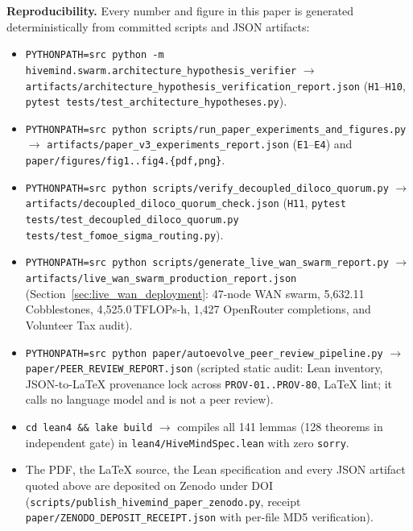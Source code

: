 \documentclass[11pt,a4paper]{article}
\begin{document}
\textbf{Reproducibility.} Every number and figure in this paper is generated deterministically from committed scripts and JSON artifacts:
\begin{itemize}[leftmargin=1.8em]
    \item \texttt{PYTHONPATH=src python -m hivemind.swarm.architecture\_hypothesis\_verifier} $\to$ \texttt{artifacts/architecture\_hypothesis\_verification\_report.json} (\texttt{H1}--\texttt{H10}, \texttt{pytest tests/test\_architecture\_hypotheses.py}).
    \item \texttt{PYTHONPATH=src python scripts/run\_paper\_experiments\_and\_figures.py} $\to$ \texttt{artifacts/paper\_v3\_experiments\_report.json} (\texttt{E1}--\texttt{E4}) and \texttt{paper/figures/fig1..fig4.\{pdf,png\}}.
    \item \texttt{PYTHONPATH=src python scripts/verify\_decoupled\_diloco\_quorum.py} $\to$ \texttt{artifacts/decoupled\_diloco\_quorum\_check.json} (\texttt{H11}, \texttt{pytest tests/test\_decoupled\_diloco\_quorum.py tests/test\_fomoe\_sigma\_routing.py}).
    \item \texttt{PYTHONPATH=src python scripts/generate\_live\_wan\_swarm\_report.py} $\to$ \texttt{artifacts/live\_wan\_swarm\_production\_report.json} (Section~\ref{sec:live_wan_deployment}: 47-node WAN swarm, 5{,}632.11 Cobblestones, 4{,}525.0\,TFLOPs-h, 1{,}427 OpenRouter completions, and Volunteer Tax audit).
    \item \texttt{PYTHONPATH=src python paper/autoevolve\_peer\_review\_pipeline.py} $\to$ \texttt{paper/PEER\_REVIEW\_REPORT.json} (scripted static audit: Lean inventory, JSON-to-LaTeX provenance lock across \texttt{PROV-01..PROV-80}, LaTeX lint; it calls no language model and is not a peer review).
    \item \texttt{cd lean4 \&\& lake build} $\to$ compiles all 141 lemmas (128 theorems in independent gate) in \texttt{lean4/HiveMindSpec.lean} with zero \texttt{sorry}.
    \item The PDF, the LaTeX source, the Lean specification and every JSON artifact quoted above are deposited on Zenodo under DOI \zenodoDOI{} (\texttt{scripts/publish\_hivemind\_paper\_zenodo.py}, receipt \texttt{paper/ZENODO\_DEPOSIT\_RECEIPT.json} with per-file MD5 verification).
\end{itemize}
\end{document}
